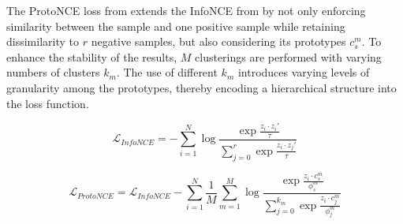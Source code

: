 The ProtoNCE loss from  extends the InfoNCE from  
by not only enforcing similarity between the sample and 
one positive sample while retaining dissimilarity to $r$ negative samples, 
but also considering its prototypes $c^m_s$. 
To enhance the stability of the results, $M$ clusterings are performed with varying numbers of clusters $k_m$. 
The use of different $k_m$ introduces varying levels of granularity among the prototypes, 
thereby encoding a hierarchical structure into the loss function.

\begin{equation}
    \mathcal{L}_{InfoNCE}= - \sum_{i=1}^{N}\log\frac{\exp \frac{z_i\cdot z_i'}{\tau}}{\sum_{j=0}^{r}\exp \frac{z_i\cdot z_j'}{\tau}}
    \label{eq:InfoNCE}
\end{equation}

\begin{equation}
    \mathcal{L}_{ProtoNCE}=\mathcal{L}_{InfoNCE} - \sum_{i=1}^{N} \frac{1}{M} \sum_{m=1}^{M} \log\frac{\exp \frac{z_i\cdot c_s^m}{\phi^m_s}}{\sum_{j=0}^{k_m}\exp \frac{z_i\cdot c_j^m}{\phi^m_j}}
    \label{eq:ProtoNCE}
\end{equation}


